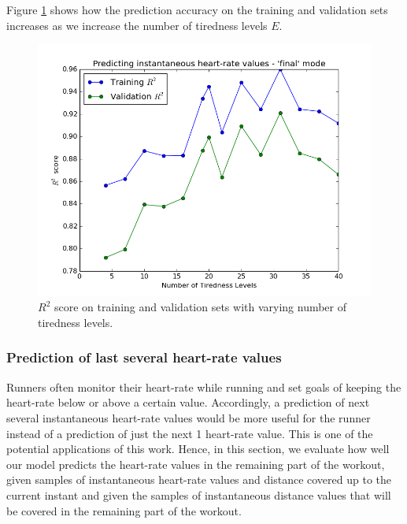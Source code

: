 \documentclass{acm_proc_article-sp}
\begin{document}
Figure \ref{figR2vsTirednessLevels} shows how the prediction accuracy on the training and validation sets increases as we increase the number of tiredness levels $E$. 

\begin{figure}[h]
\centering
\includegraphics[scale=0.4]{../src/plots/r2_vs_num_tiredness_levels}
\caption{\label{figR2vsTirednessLevels} $R^2$ score on training and validation sets with varying number of tiredness levels.}
\end{figure}

\subsubsection{Prediction of last several heart-rate values}
Runners often monitor their heart-rate while running and set goals of keeping the heart-rate below or above a certain value. Accordingly, a prediction of next several instantaneous heart-rate values would be more useful for the runner instead of a prediction of just the next 1 heart-rate value. This is one of the potential applications of this work. Hence, in this section, we evaluate how well our model predicts the heart-rate values in the remaining part of the workout, given samples of instantaneous heart-rate values and distance covered up to the current instant and given the samples of instantaneous distance values that will be covered in the remaining part of the workout.
\end{document}
